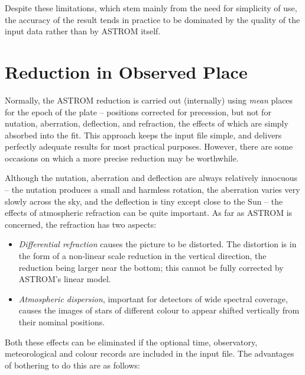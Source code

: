 \documentclass[twoside,11pt]{article}
\newcommand{\xlabel}[1]{}
\renewcommand{\_}{\texttt{\symbol{95}}}
\begin{document}
Despite these limitations, which stem mainly from the need for simplicity
of use, the accuracy of the result tends in practice to be dominated by
the quality of the input data rather than by ASTROM itself.

\section{\xlabel{reduction_in_observed_place}Reduction in Observed Place}
\label{reduction_in_observed_place}

Normally, the ASTROM reduction is carried out (internally) using
\textit{mean} places for the epoch of the plate -- positions
corrected for precession, but not for nutation, aberration, deflection,
and refraction, the effects of which are simply absorbed into the fit.
This approach keeps the input file simple, and delivers perfectly adequate
results for most practical purposes.  However, there are some occasions
on which a more precise reduction may be worthwhile.

Although the nutation, aberration and deflection are always relatively
innocuous -- the nutation produces a small and harmless rotation, the
aberration varies very slowly across the sky, and the deflection is
tiny except close to the Sun -- the effects of atmospheric refraction
can be quite important.  As far as ASTROM is concerned, the refraction
has two aspects:

\begin{itemize}

   \item \textit{Differential refraction} causes the picture to be
      distorted.  The distortion is in the form of a non-linear scale
      reduction in the vertical direction, the reduction being larger
      near the bottom;  this cannot be fully corrected by ASTROM's
      linear model.

   \item \textit{Atmospheric dispersion}, important for detectors of wide
      spectral coverage, causes the images of stars of different colour
      to appear shifted vertically from their nominal positions.

\end{itemize}

Both these effects can be eliminated if the optional time, observatory,
meteorological and colour records are included in the input file.
The advantages of bothering to do this are as follows:
\end{document}
